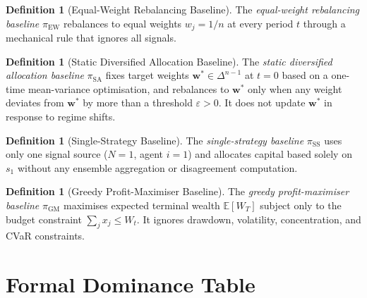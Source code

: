 \documentclass[12pt,openany]{book}
\newcommand{\bfw}{\mathbf{w}}
\newcommand{\E}{\mathbb{E}}
\numberwithin{equation}{chapter}
\theoremstyle{plain}
\theoremstyle{definition}
\newtheorem{definition}[theorem]{Definition}
\theoremstyle{remark}
\numberwithin{equation}{chapter}
\theoremstyle{plain}
\begin{document}
\begin{definition}[Equal-Weight Rebalancing Baseline]
\label{def:ew}
The \emph{equal-weight rebalancing baseline} $\pi_{\mathrm{EW}}$
rebalances to equal weights $w_j = 1/n$ at every period $t$
through a mechanical rule that ignores all signals.
\end{definition}

\begin{definition}[Static Diversified Allocation Baseline]
\label{def:sa}
The \emph{static diversified allocation baseline} $\pi_{\mathrm{SA}}$
fixes target weights $\bfw^* \in \Delta^{n-1}$ at $t=0$ based on a
one-time mean-variance optimisation, and rebalances to $\bfw^*$ only
when any weight deviates from $\bfw^*$ by more than a threshold
$\varepsilon > 0$.  It does not update $\bfw^*$ in response to
regime shifts.
\end{definition}

\begin{definition}[Single-Strategy Baseline]
\label{def:ss}
The \emph{single-strategy baseline} $\pi_{\mathrm{SS}}$ uses only
one signal source ($N=1$, agent $i=1$) and allocates capital
based solely on $s_1$ without any ensemble aggregation or
disagreement computation.
\end{definition}

\begin{definition}[Greedy Profit-Maximiser Baseline]
\label{def:gm}
The \emph{greedy profit-maximiser baseline} $\pi_{\mathrm{GM}}$
maximises expected terminal wealth $\E[W_T]$ subject only to the
budget constraint $\sum_j x_j \leq W_t$.  It ignores drawdown,
volatility, concentration, and CVaR constraints.
\end{definition}

\section{Formal Dominance Table}
\end{document}
